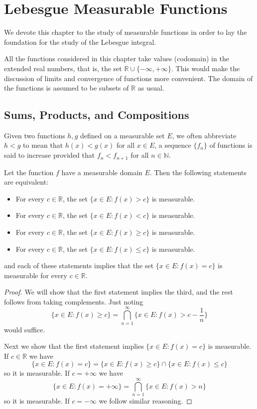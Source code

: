 \documentclass[../main.tex]{subfiles}
\begin{document}
\chapter{Lebesgue Measurable Functions}

We devote this chapter to the study of measurable functions in order to lay the foundation for the study of the Lebesgue integral.

All the functions considered in this chapter take values (codomain) in the extended real numbers, that is, the set $\mathbb{R} \cup \{-\infty, +\infty\}$. This would make the discussion of limits and convergence of functions more convenient. The domain of the functions is assumed to be subsets of $\mathbb{R}$ as usual.

\section{Sums, Products, and Compositions}
Given two functions $h,g$ defined on a measurable set $E$, we often abbreviate $h < g$ to mean that $h(x) < g(x)$ for all $x \in E$, a sequence $\{f_n\}$ of functions is said to increase provided that $f_n < f_{n+1}$ for all $n \in \mathbb{N}$.

\begin{proposition}{}{}
	Let the function $f$ have a measurable domain $E$. Then the following statements are equivalent:
	\begin{itemize}
		\item For every $c \in \mathbb{R}$, the set $\{x \in E : f(x) > c\}$ is measurable.
		\item For every $c \in \mathbb{R}$, the set $\{x \in E : f(x) < c\}$ is measurable.
		\item For every $c \in \mathbb{R}$, the set $\{x \in E : f(x) \geq c\}$ is measurable.
		\item For every $c \in \mathbb{R}$, the set $\{x \in E : f(x) \leq c\}$ is measurable.
	\end{itemize}
	and each of these statements implies that the set $\{x \in E : f(x) = c\}$ is measurable for every $c \in \mathbb{R}$.
\end{proposition}
\begin{proof}
	We will show that the first statement implies the third, and the rest follows from taking complements. Just noting
	\begin{equation*}
		\{x \in E : f(x) \geq c\} = \bigcap_{n=1}^{\infty} \{x \in E : f(x) > c - \frac{1}{n}\}
	\end{equation*}
	would suffice.

	Next we show that the first statement implies $\{x \in E : f(x) = c\}$ is measurable. If $c\in \mathbb{R}$ we have
	\begin{equation*}
		\{x \in E : f(x) = c\} = \{x \in E : f(x) \geq c\} \cap \{x \in E : f(x) \leq c\}
	\end{equation*}
	so it is measurable. If $c = +\infty$ we have
	\begin{equation*}
		\{x \in E : f(x) = +\infty\} = \bigcap_{n=1}^{\infty} \{x \in E : f(x) > n\}
	\end{equation*}
	so it is measurable. If $c = -\infty$ we follow similar reasoning.
\end{proof}
\end{document}
